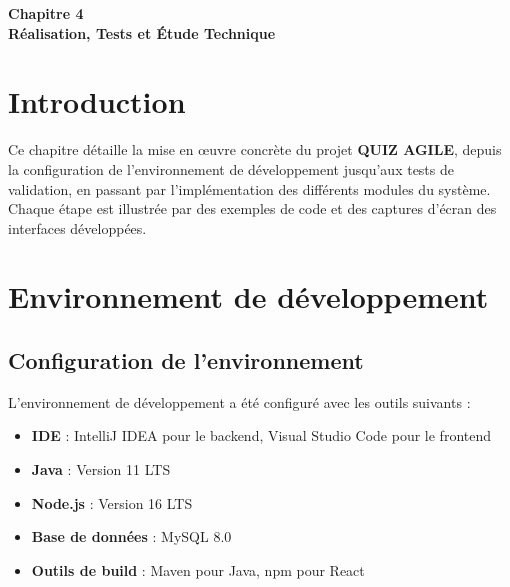 \documentclass[12pt,a4paper]{report}
\begin{document}

\cleardoublepage
\thispagestyle{empty}
\begin{center}
    \vspace*{4cm}
    {\Huge \textbf{Chapitre 4}}\\[1.5cm]
    {\LARGE \textbf{Réalisation, Tests et Étude Technique}}
\end{center}
\cleardoublepage

\setcounter{section}{0}

\section{Introduction}

Ce chapitre détaille la mise en œuvre concrète du projet \textbf{QUIZ AGILE}, depuis la configuration de l'environnement de développement jusqu'aux tests de validation, en passant par l'implémentation des différents modules du système. Chaque étape est illustrée par des exemples de code et des captures d'écran des interfaces développées.

\section{Environnement de développement}

\subsection{Configuration de l'environnement}

L'environnement de développement a été configuré avec les outils suivants :

\begin{itemize}
    \item \textbf{IDE} : IntelliJ IDEA pour le backend, Visual Studio Code pour le frontend
    \item \textbf{Java} : Version 11 LTS
    \item \textbf{Node.js} : Version 16 LTS
    \item \textbf{Base de données} : MySQL 8.0
    \item \textbf{Outils de build} : Maven pour Java, npm pour React
\end{itemize}
\end{document}
